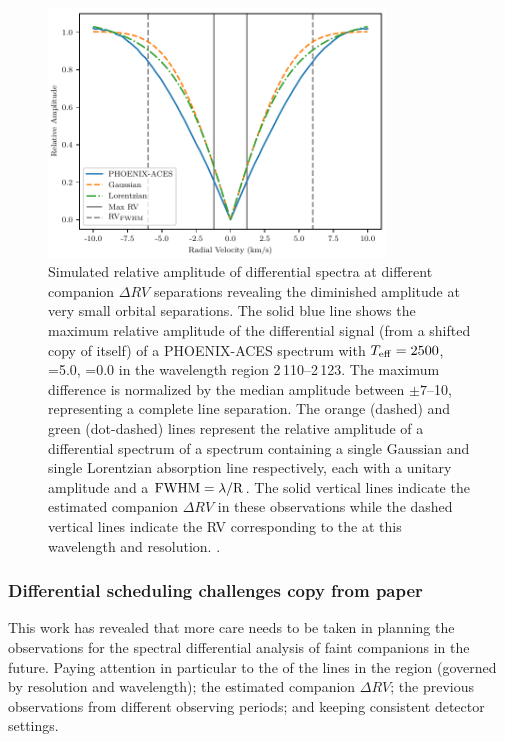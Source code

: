 \begin{figure}
    \centering
    \includegraphics[width=0.8\textwidth]{figures/direct-recovery/rv_diff_final.pdf}
    \caption{Simulated relative amplitude of differential spectra at different companion \(\Delta RV\) separations revealing the diminished amplitude at very small orbital separations.
    The solid blue line shows the maximum relative amplitude of the differential signal (from a shifted copy of itself) of a {PHOENIX-ACES} spectrum with \(T_{\mathrm{eff}}{}=2500\)\K{}, \logg{}=5.0, \feh{}=0.0 in the wavelength region 2\,110--2\,123\nm{}.
    The maximum difference is normalized by the median amplitude between \(\pm7\)--10\kmps{}, representing a complete line separation.
    The orange (dashed) and green (dot-dashed) lines represent the relative amplitude of a differential spectrum of a spectrum containing a single Gaussian and single Lorentzian absorption line respectively, each with a unitary amplitude and a \(\rm {\textrm{FWHM}} = \lambda / R\).
    The solid vertical lines indicate the estimated companion \(\Delta {RV}\) in these observations while the dashed vertical lines indicate the {RV} corresponding to the {\fwhm} at this wavelength and resolution. .}
    \label{fig:diff_amp}
\end{figure}








\subsubsection{Differential scheduling challenges {copy from paper}}
\label{subsubsec:differential-schedualing}
This work has revealed that more care needs to be taken in planning the observations for the spectral differential analysis of faint companions in the future.
Paying attention in particular to the {\fwhm} of the lines in the region (governed by resolution and wavelength); the estimated companion \(\Delta {RV}\); the previous observations from different observing periods; and keeping consistent detector settings.

